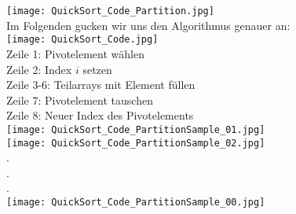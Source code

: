 	\begin{center}
		\texttt{[image: QuickSort\_Code\_Partition.jpg]} \\ \vspace{0.5cm}
		Im Folgenden gucken wir uns den Algorithmus genauer an: \\ \vspace{0.5cm}
		\texttt{[image: QuickSort\_Code.jpg]} \\ \vspace{0.5cm}
		Zeile 1: Pivotelement wählen \\
		Zeile 2: Index $i$ setzen \\
		Zeile 3-6: Teilarrays mit Element füllen \\
		Zeile 7: Pivotelement tauschen \\
		Zeile 8: Neuer Index des Pivotelements \\ \vspace{0.9cm}
		\texttt{[image: QuickSort\_Code\_PartitionSample\_01.jpg]} \\
		\texttt{[image: QuickSort\_Code\_PartitionSample\_02.jpg]} \\
		. \\
		. \\
		. \\
		\texttt{[image: QuickSort\_Code\_PartitionSample\_00.jpg]} \\
	\end{center}



